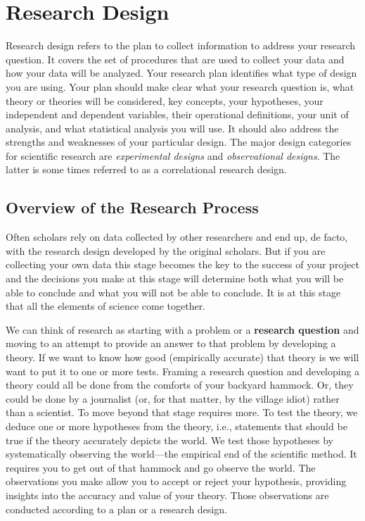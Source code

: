 \documentclass[11pt,openany]{book}\usepackage[]{graphicx}\usepackage[]{color}
\begin{document}
\chapter{Research Design}

Research design refers to the plan to collect information to address your research question. It covers the set of procedures that are used to collect your data and how your data will be analyzed. Your research plan identifies what type of design you are using. Your plan should make clear what your research question is, what theory or theories will be considered, key concepts, your hypotheses, your independent and dependent variables, their operational definitions, your unit of analysis, and what statistical analysis you will use. It should also address the strengths and weaknesses of your particular design. The major design categories for scientific research are \textit{experimental designs} and \textit{observational designs}. The latter is some times referred to as a correlational research design.

\section{Overview of the Research Process} 

Often scholars rely on data collected by other researchers and end up, de facto, with the research design developed by the original scholars. But if you are collecting your own data this stage becomes the key to the success of your project and the decisions you make at this stage will determine both what you will be able to conclude and what you will not be able to conclude. It is at this stage that all the elements of science come together. 

We can think of research as starting with a problem or a \textbf{research question} and moving to an attempt to provide an answer to that problem by developing a theory. If we want to know how good (empirically accurate) that theory is we will want to put it to one or more tests. Framing a research question and developing a theory could all be done from the comforts of your backyard hammock. Or, they could be done by a journalist (or, for that matter, by the village idiot) rather than a scientist. To move beyond that stage requires more. To test the theory, we deduce one or more hypotheses from the theory, i.e., statements that should be true if the theory accurately depicts the world. We test those hypotheses by systematically observing the world---the empirical end of the scientific method.  It requires you to get out of that hammock and go observe the world. The observations you make allow you to accept or reject your hypothesis, providing insights into the accuracy and value of your theory. Those observations are conducted according to a plan or a research design. 
\end{document}
